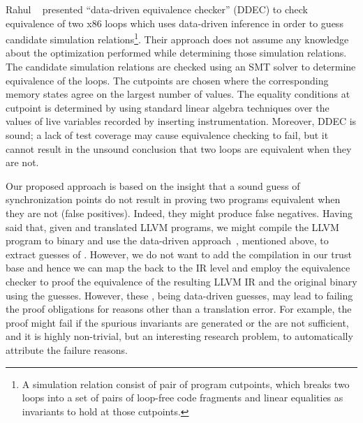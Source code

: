 Rahul \etal~\cite{DDEC:OOPSLA:2013} presented ``data-driven equivalence checker'' (DDEC) to check equivalence of two x86 loops which uses data-driven inference in order to guess candidate simulation relations\footnote{A simulation relation consist of pair of program cutpoints, which breaks two loops into a set of pairs of loop-free code fragments and  linear equalities as invariants to hold at those cutpoints.}. Their approach does not assume any knowledge about the optimization performed while determining those simulation relations. The candidate simulation relations are checked using an SMT solver to determine equivalence of the loops. The cutpoints are chosen where the corresponding memory states agree on the largest number of values. The equality conditions   at cutpoint is determined by using standard linear algebra techniques over the values of live variables recorded by inserting instrumentation. Moreover, DDEC is sound; a lack of test coverage may cause equivalence checking to fail, but it cannot result in the unsound conclusion that two loops are equivalent when they are not.    



Our proposed approach is based on the insight that a sound guess of synchronization
points do not result in proving two programs equivalent when they are not
(false positives). Indeed, they might produce false negatives. Having said
that, given  \ISA and translated LLVM programs, we might compile the LLVM
program to binary and use the data-driven approach~\cite{DDEC:OOPSLA:2013}, mentioned above, to extract guesses of
\syncps. However, we do not want to add the compilation in our
trust base and hence we can map the \syncps back to the IR level
and employ the equivalence checker  to proof the equivalence of the resulting
LLVM IR and the original binary using the \syncp guesses. However, these \syncp, being data-driven guesses, may lead to failing the proof obligations for reasons other than a translation error. For example, the proof might fail if the spurious invariants are generated or the \syncps are not sufficient, and it is highly non-trivial, but an interesting research problem, to automatically attribute the failure reasons. 

